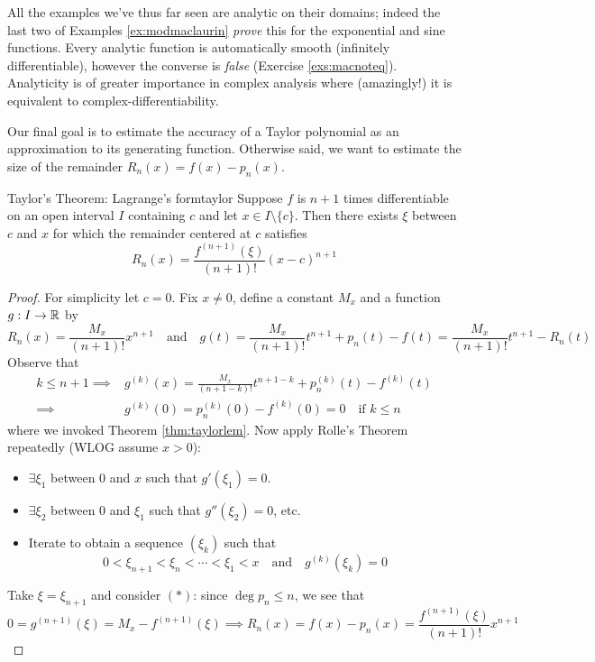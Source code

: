 All the examples we've thus far seen are analytic on their domains; indeed the last two of Examples \ref{ex:modmaclaurin} \emph{prove} this for the exponential and sine functions. Every analytic function is automatically smooth (infinitely differentiable), however the converse is \emph{false} (Exercise \ref{exs:macnoteq}). Analyticity is of greater importance in complex analysis where (amazingly!) it is equivalent to complex-differentiability.

\goodbreak



Our final goal is to estimate the accuracy of a Taylor polynomial as an approximation to its generating function. Otherwise said, we want to estimate the size of the remainder $R_n(x)=f(x)-p_n(x)$.

\begin{thm}{Taylor's Theorem: Lagrange's form}{taylor}
	Suppose $f$ is $n+1$ times differentiable on an open interval $I$ containing $c$ and let $x\in I\setminus\{c\}$. Then there exists $\xi$ between $c$ and $x$ for which the remainder centered at $c$ satisfies
	\[
		R_n(x)=\frac{f^{(n+1)}(\xi)}{(n+1)!}(x-c)^{n+1}
	\] 
\end{thm}

\begin{proof}
	For simplicity let $c=0$. Fix $x\neq 0$, define a constant $M_x$ and a function $g:I\to\mathbb{R}$ by
	\[
		R_n(x)=\frac{M_x}{(n+1)!}x^{n+1}
		\quad\text{and}\quad 
		g(t)=\frac{M_x}{(n+1)!}t^{n+1}+p_{n}(t)-f(t) 
		=\frac{M_x}{(n+1)!}t^{n+1}-R_{n}(t)
	\]
	Observe that
	\begin{align*}
		k\le n+1\implies 
		&g^{(k)}(x)=\frac{M_x}{(n+1-k)!}t^{n+1-k}+p^{(k)}_n(t)-f^{(k)}(t)\tag{$\ast$}\\
		\implies &g^{(k)}(0)=p^{(k)}_n(0)-f^{(k)}(0) =0
		\quad \text{if $k\le n$}
	\end{align*}
	where we invoked Theorem \ref{thm:taylorlem}.\smallbreak
	Now apply Rolle's Theorem repeatedly (WLOG assume $x>0$):
	\begin{itemize}
	  \item $\exists\xi_1$ between 0 and $x$ such that $g'(\xi_1)=0$.
	  \item $\exists\xi_2$ between 0 and $\xi_1$ such that $g''(\xi_2)=0$, etc.
	  \item Iterate to obtain a sequence $(\xi_k)$ such that
	  \[
	  	0<\xi_{n+1}<\xi_n<\cdots <\xi_1<x\quad\text{and}\quad g^{(k)}(\xi_k)=0
	  \]
	\end{itemize}
	Take $\xi=\xi_{n+1}$ and consider $(\ast)$: since $\operatorname{deg}p_n\le n$, we see that
	\[
		0=g^{(n+1)}(\xi)=M_x-f^{(n+1)}(\xi) 
		\implies R_n(x)=f(x)-p_n(x)
		=\frac{f^{(n+1)}(\xi)}{(n+1)!}x^{n+1}
		\tag*{\qedhere}
	\]
\end{proof}



